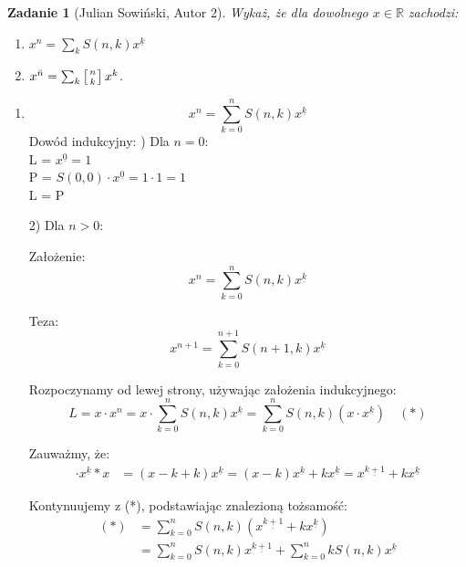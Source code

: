 \documentclass{mwart}
\newtheorem{zad}{Zadanie}[section]
\begin{document}
\begin{zad}[Julian Sowiński, Autor 2]
    Wykaż, że dla dowolnego $x \in \mathbb{R}$ zachodzi:
    \begin{enumerate}
        \item $x^n = \sum_{k}S(n,k) x^{\underline{k}}$
        \item $x^{\bar{n}} = \sum_{k} \left[n \atop k \right] x^k$.
    \end{enumerate}
\end{zad}
\begin{mdframed}
    \begin{enumerate}
        \item
              $$x^n = \sum_{k=0}^n S(n,k) x^{\underline{k}}$$
              Dowód indukcyjny:
              \newline {}) Dla $n=0$: \\
              L = $x^{\underline{0}} = 1$ \\
              P = $S(0,0) \cdot x^{\underline{0}} = 1 \cdot 1 = 1$ \\
              L = P

              2) Dla $n>0$:

              Założenie: $$x^n = \sum_{k=0}^n S(n,k) x^{\underline{k}}$$

              Teza: $$x^{n+1} = \sum_{k=0}^{n+1} S(n+1,k) x^{\underline{k}}$$

              Rozpoczynamy od lewej strony, używając założenia indukcyjnego:
              $$L = x \cdot x^n = x \cdot \sum_{k=0}^n S(n,k) x^{\underline{k}} = \sum_{k=0}^n S(n,k) (x \cdot x^{\underline{k}}) \quad (*)$$

              Zauważmy, że:
              \begin{align*}
                  \cdot x^{\underline{k}}*x & = (x-k+k) x^{\underline{k}} = (x-k) x^{\underline{k}} + k x^{\underline{k}} = x^{\underline{k+1}} + k x^{\underline{k}}
              \end{align*}

              Kontynuujemy z (*), podstawiając znalezioną tożsamość:
              \begin{align*}
                  (*) & = \sum_{k=0}^n S(n,k) (x^{\underline{k+1}} + k x^{\underline{k}})                   \\
                      & = \sum_{k=0}^n S(n,k) x^{\underline{k+1}} + \sum_{k=0}^n k S(n,k) x^{\underline{k}}
              \end{align*}


\end{enumerate}
\end{mdframed}
\end{document}

